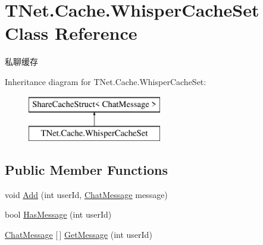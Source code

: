 \hypertarget{class_t_net_1_1_cache_1_1_whisper_cache_set}{}\section{T\+Net.\+Cache.\+Whisper\+Cache\+Set Class Reference}
\label{class_t_net_1_1_cache_1_1_whisper_cache_set}


私聊缓存  


Inheritance diagram for T\+Net.\+Cache.\+Whisper\+Cache\+Set\+:\begin{figure}[H]
\begin{center}
\leavevmode
\includegraphics[height=2.000000cm]{class_t_net_1_1_cache_1_1_whisper_cache_set}
\end{center}
\end{figure}
\subsection*{Public Member Functions}
\begin{DoxyCompactItemize}
\item 
void \mbox{\hyperlink{class_t_net_1_1_cache_1_1_whisper_cache_set_a15b655eac64df17e8ae33684b97b70c5}{Add}} (int user\+Id, \mbox{\hyperlink{class_t_net_1_1_model_1_1_chat_message}{Chat\+Message}} message)
\item 
bool \mbox{\hyperlink{class_t_net_1_1_cache_1_1_whisper_cache_set_a5b9fb703be93bc78d3df1c8cd8e4a0ea}{Has\+Message}} (int user\+Id)
\item 
\mbox{\hyperlink{class_t_net_1_1_model_1_1_chat_message}{Chat\+Message}} \mbox{[}$\,$\mbox{]} \mbox{\hyperlink{class_t_net_1_1_cache_1_1_whisper_cache_set_a0e3727867bfd4158150a95e3ae0963f1}{Get\+Message}} (int user\+Id)
\end{DoxyCompactItemize}
